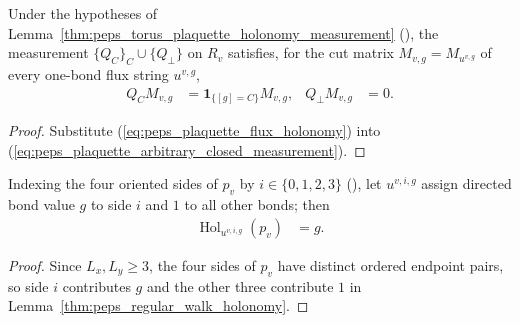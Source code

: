 \begin{lemma}%
    \label{thm:peps_torus_plaquette_flux_class_measurement}
    \leanok
    Under the hypotheses of Lemma~\ref{thm:peps_torus_plaquette_holonomy_measurement} (\cite[Theorem~6.15]{Schuch2010PEPS}), the measurement $\{Q_C\}_C\cup\{Q_\perp\}$ on $R_v$ satisfies, for the cut matrix $M_{v,g}=M_{u^{v,g}}$ of every one-bond flux string $u^{v,g}$,
    \begin{align}
        Q_CM_{v,g}      & =\mathbf1_{\{[g]=C\}}M_{v,g}, &
        Q_\perp M_{v,g} & =0.
        \label{eq:peps_plaquette_flux_closed_measurement}
    \end{align}
\end{lemma}
\begin{proof}\leanok
    Substitute (\ref{eq:peps_plaquette_flux_holonomy}) into (\ref{eq:peps_plaquette_arbitrary_closed_measurement}).
\end{proof}

\begin{definition}%
    \label{def:peps_torus_plaquette_all_sides_insertion}
    \leanok
    Indexing the four oriented sides of $p_v$ by $i\in\{0,1,2,3\}$ (\cite[proof of Theorem~6.15]{Schuch2010PEPS}), let $u^{v,i,g}$ assign directed bond value $g$ to side $i$ and $1$ to all other bonds; then
    \begin{align}
        \operatorname{Hol}_{u^{v,i,g}}(p_v) & =g.
        \label{eq:peps_plaquette_all_sides_holonomy}
    \end{align}
\end{definition}
\begin{proof}\leanok
    Since $L_x,L_y\ge3$, the four sides of $p_v$ have distinct ordered endpoint pairs, so side $i$ contributes $g$ and the other three contribute $1$ in Lemma~\ref{thm:peps_regular_walk_holonomy}.
\end{proof}


